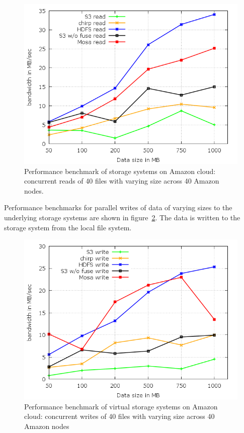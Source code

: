 \documentclass[10pt,journal,cspaper,compsoc]{IEEEtran}
\begin{document}
\begin{figure}[htb]
\begin{center}
\includegraphics[width=\linewidth]{plots/par-read-bw.png}
\caption{Performance benchmark of storage systems on Amazon cloud:
concurrent reads of 40 files with varying size across 40 Amazon nodes.
\label{fig:par-rd-bench} }
\end{center}
\end{figure}

Performance benchmarks for parallel writes of data of varying sizes to the
underlying storage systems are shown in figure~\ref{fig:par-wr-bench}. The data
is written to the storage system from the local file system.

\begin{figure}[htb]
\begin{center}
\includegraphics[width=\linewidth]{plots/par-write-bw.png}
\caption{Performance benchmark of virtual storage systems on Amazon cloud:
concurrent writes of 40 files with varying size across 40 Amazon nodes
\label{fig:par-wr-bench} }
\end{center}
\end{figure}
\end{document}
